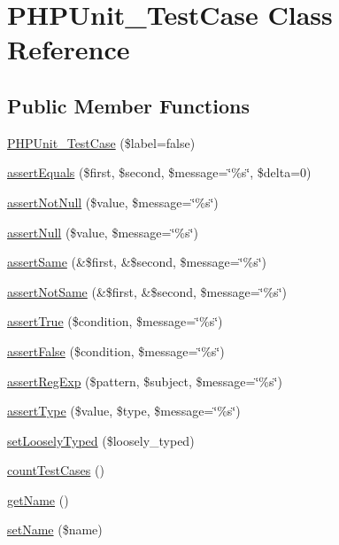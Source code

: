 \hypertarget{class_p_h_p_unit___test_case}{
\section{PHPUnit\_\-TestCase Class Reference}
\label{class_p_h_p_unit___test_case}
}
\subsection*{Public Member Functions}
\begin{DoxyCompactItemize}
\item 
\hyperlink{class_p_h_p_unit___test_case_aa9026b99fa5faf9174a845db4c65f7d7}{PHPUnit\_\-TestCase} (\$label=false)
\item 
\hyperlink{class_p_h_p_unit___test_case_ae27941be41c5131649e79cb0809d742d}{assertEquals} (\$first, \$second, \$message=\char`\"{}\%s\char`\"{}, \$delta=0)
\item 
\hyperlink{class_p_h_p_unit___test_case_a9b906d5a1b0f27570f1c396e2a5a99e9}{assertNotNull} (\$value, \$message=\char`\"{}\%s\char`\"{})
\item 
\hyperlink{class_p_h_p_unit___test_case_ad8562d55d3341b088a6d90d38c1024e9}{assertNull} (\$value, \$message=\char`\"{}\%s\char`\"{})
\item 
\hyperlink{class_p_h_p_unit___test_case_a707c89ec40005bbf0cd002509c276ab2}{assertSame} (\&\$first, \&\$second, \$message=\char`\"{}\%s\char`\"{})
\item 
\hyperlink{class_p_h_p_unit___test_case_ad616a8e124f71e003fdee1c484a5910f}{assertNotSame} (\&\$first, \&\$second, \$message=\char`\"{}\%s\char`\"{})
\item 
\hyperlink{class_p_h_p_unit___test_case_a79026299eab938527a32d85e33f331fa}{assertTrue} (\$condition, \$message=\char`\"{}\%s\char`\"{})
\item 
\hyperlink{class_p_h_p_unit___test_case_a02877e6baddfe151e45b3fbde0697a63}{assertFalse} (\$condition, \$message=\char`\"{}\%s\char`\"{})
\item 
\hyperlink{class_p_h_p_unit___test_case_a2b02612d6eae4fc5ff14621019fff7e5}{assertRegExp} (\$pattern, \$subject, \$message=\char`\"{}\%s\char`\"{})
\item 
\hyperlink{class_p_h_p_unit___test_case_abe8fbcd84601418096c442315d165c81}{assertType} (\$value, \$type, \$message=\char`\"{}\%s\char`\"{})
\item 
\hyperlink{class_p_h_p_unit___test_case_aa23d060b8bc5da84ca3e76ba7d41f64b}{setLooselyTyped} (\$loosely\_\-typed)
\item 
\hyperlink{class_p_h_p_unit___test_case_a4d4116898093e6b3985a8f99f95d2296}{countTestCases} ()
\item 
\hyperlink{class_p_h_p_unit___test_case_a5993676a471e992b22614d43d46d2829}{getName} ()
\item 
\hyperlink{class_p_h_p_unit___test_case_a976c20907e244e08e662e51428534171}{setName} (\$name)
\end{DoxyCompactItemize}
